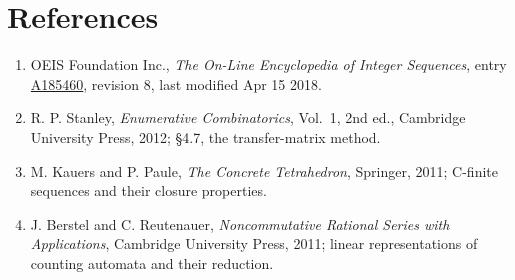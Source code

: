 \documentclass[11pt]{article}
\theoremstyle{definition}
\begin{document}
\section{References}

\begin{enumerate}

\item OEIS Foundation Inc., \emph{The On-Line Encyclopedia of Integer Sequences}, entry \href{https://oeis.org/A185460}{A185460}, revision 8, last modified Apr 15 2018.

\item R. P. Stanley, \emph{Enumerative Combinatorics}, Vol.~1, 2nd ed., Cambridge University Press, 2012; \S4.7, the transfer-matrix method.

\item M. Kauers and P. Paule, \emph{The Concrete Tetrahedron}, Springer, 2011; C-finite sequences and their closure properties.

\item J. Berstel and C. Reutenauer, \emph{Noncommutative Rational Series with Applications}, Cambridge University Press, 2011; linear representations of counting automata and their reduction.

\end{enumerate}
\end{document}
